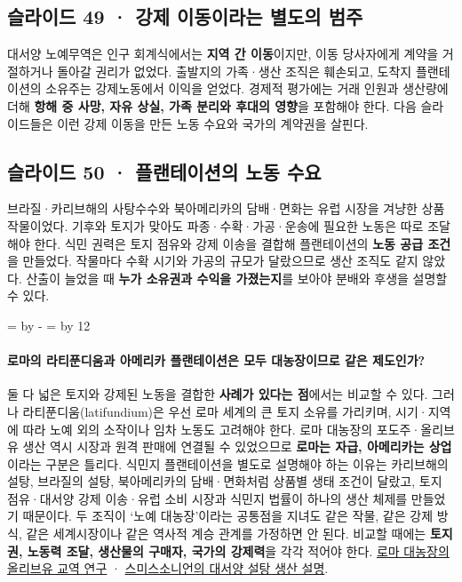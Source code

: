 \documentclass[10pt,a4paper]{article}
\newcommand{\ReserveQuestionSpace}{%
  \par\begingroup
  \dimen0=\pagegoal \advance\dimen0 by -\pagetotal
  \dimen2=\baselineskip \multiply\dimen2 by 12
  \ifdim\dimen0<\dimen2 \newpage\fi
  \endgroup}
\begin{document}
\subsection{슬라이드 49 · 강제 이동이라는 별도의 범주}
대서양 노예무역은 인구 회계식에서는 \textbf{지역 간 이동}이지만, 이동 당사자에게 계약을 거절하거나 돌아갈 권리가 없었다. 출발지의 가족·생산 조직은 훼손되고, 도착지 플랜테이션의 소유주는 강제노동에서 이익을 얻었다. 경제적 평가에는 거래 인원과 생산량에 더해 \textbf{항해 중 사망, 자유 상실, 가족 분리와 후대의 영향}을 포함해야 한다. 다음 슬라이드들은 이런 강제 이동을 만든 노동 수요와 국가의 계약권을 살핀다.\par

\subsection{슬라이드 50 · 플랜테이션의 노동 수요}
브라질·카리브해의 사탕수수와 북아메리카의 담배·면화는 유럽 시장을 겨냥한 상품 작물이었다. 기후와 토지가 맞아도 파종·수확·가공·운송에 필요한 노동은 따로 조달해야 한다. 식민 권력은 토지 점유와 강제 이송을 결합해 플랜테이션의 \textbf{노동 공급 조건}을 만들었다. 작물마다 수확 시기와 가공의 규모가 달랐으므로 생산 조직도 같지 않았다. 산출이 늘었을 때 \textbf{누가 소유권과 수익을 가졌는지}를 보아야 분배와 후생을 설명할 수 있다.\par

\ReserveQuestionSpace
\paragraph{로마의 라티푼디움과 아메리카 플랜테이션은 모두 대농장이므로 같은 제도인가?}
둘 다 넓은 토지와 강제된 노동을 결합한 \textbf{사례가 있다는 점}에서는 비교할 수 있다. 그러나 라티푼디움(latifundium)은 우선 로마 세계의 큰 토지 소유를 가리키며, 시기·지역에 따라 노예 외의 소작이나 임차 노동도 고려해야 한다. 로마 대농장의 포도주·올리브유 생산 역시 시장과 원격 판매에 연결될 수 있었으므로 \textbf{로마는 자급, 아메리카는 상업}이라는 구분은 틀리다. 식민지 플랜테이션을 별도로 설명해야 하는 이유는 카리브해의 설탕, 브라질의 설탕, 북아메리카의 담배·면화처럼 상품별 생태 조건이 달랐고, 토지 점유·대서양 강제 이송·유럽 소비 시장과 식민지 법률이 하나의 생산 체제를 만들었기 때문이다. 두 조직이 ‘노예 대농장’이라는 공통점을 지녀도 같은 작물, 같은 강제 방식, 같은 세계시장이나 같은 역사적 계승 관계를 가정하면 안 된다. 비교할 때에는 \textbf{토지권, 노동력 조달, 생산물의 구매자, 국가의 강제력}을 각각 적어야 한다. \href{https://assets.cambridge.org/97811071/64314/excerpt/9781107164314\_excerpt.pdf}{로마 대농장의 올리브유 교역 연구} · \href{https://www.americanhistory.si.edu/explore/exhibitions/on-the-water/online/living-atlantic-world/new-tastes-new-trades/sugar-trade}{스미스소니언의 대서양 설탕 생산 설명}.\par
\end{document}
